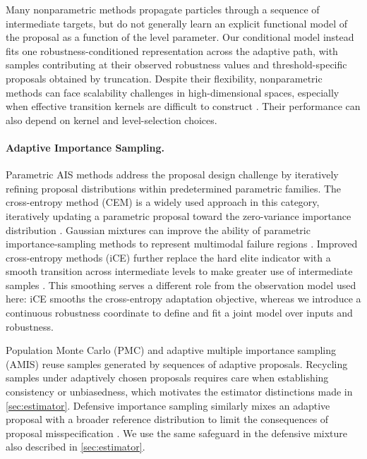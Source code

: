 \documentclass[twoside,11pt]{article}
\begin{document}
Many nonparametric methods propagate particles through a sequence of intermediate targets, but do not generally learn an explicit functional model of the proposal as a function of the level parameter. Our conditional model instead fits one robustness-conditioned representation across the adaptive path, with samples contributing at their observed robustness values and threshold-specific proposals obtained by truncation. Despite their flexibility, nonparametric methods can face scalability challenges in high-dimensional spaces, especially when effective transition kernels are difficult to construct \citep{sinha2020neural}. Their performance can also depend on kernel and level-selection choices.

\paragraph{Adaptive Importance Sampling.}
Parametric AIS methods address the proposal design challenge by iteratively refining proposal distributions within predetermined parametric families. The cross-entropy method (CEM) is a widely used approach in this category, iteratively updating a parametric proposal toward the zero-variance importance distribution \citep{rubinstein2004cross, deboer2005tutorial}. Gaussian mixtures can improve the ability of parametric importance-sampling methods to represent multimodal failure regions \citep{kurtz2013cross}. Improved cross-entropy methods (iCE) further replace the hard elite indicator with a smooth transition across intermediate levels to make greater use of intermediate samples \citep{papaioannou2019improved}. This smoothing serves a different role from the observation model used here: iCE smooths the cross-entropy adaptation objective, whereas we introduce a continuous robustness coordinate to define and fit a joint model over inputs and robustness.

Population Monte Carlo (PMC) \citep{cappe2004population} and adaptive multiple importance sampling (AMIS) \citep{cornuet2012adaptive,marin2014consistency} reuse samples generated by sequences of adaptive proposals. Recycling samples under adaptively chosen proposals requires care when establishing consistency or unbiasedness, which motivates the estimator distinctions made in \cref{sec:estimator}. Defensive importance sampling similarly mixes an adaptive proposal with a broader reference distribution to limit the consequences of proposal misspecification \citep{hesterberg1995weighted,owen2000safe}. We use the same safeguard in the defensive mixture also described in \cref{sec:estimator}.
\end{document}
